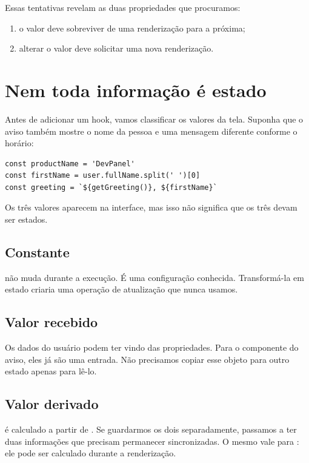 Essas tentativas revelam as duas propriedades que procuramos:

\begin{enumerate}
  \item o valor deve sobreviver de uma renderização para a próxima;
  \item alterar o valor deve solicitar uma nova renderização.
\end{enumerate}

\section{Nem toda informação é estado}

Antes de adicionar um hook, vamos classificar os valores da tela. Suponha que o
aviso também mostre o nome da pessoa e uma mensagem diferente conforme o horário:

\begin{lstlisting}
const productName = 'DevPanel'
const firstName = user.fullName.split(' ')[0]
const greeting = `${getGreeting()}, ${firstName}`
\end{lstlisting}

Os três valores aparecem na interface, mas isso não significa que os três devam
ser estados.

\subsection{Constante}

 não muda durante a execução. É uma configuração conhecida.
Transformá-la em estado criaria uma operação de atualização que nunca usamos.

\subsection{Valor recebido}

Os dados do usuário podem ter vindo das propriedades. Para o componente do
aviso, eles já são uma entrada. Não precisamos copiar esse objeto para outro
estado apenas para lê-lo.

\subsection{Valor derivado}

 é calculado a partir de . Se guardarmos
os dois separadamente, passamos a ter duas informações que precisam permanecer
sincronizadas. O mesmo vale para : ele pode ser calculado
durante a renderização.

